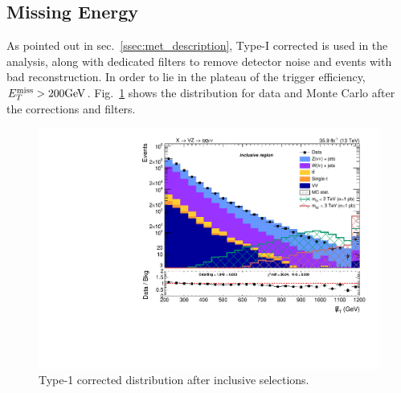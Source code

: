 
\subsection{Missing Energy}
As pointed out in sec.~\ref{ssec:met_description}, Type-I corrected \MET is used in the analysis, along with dedicated filters to remove detector noise and events with bad reconstruction. In order to lie in the plateau of the trigger efficiency, $E_T^{\text{miss}} > 200 \text{GeV}$. Fig.~\ref{fig:type1_met} shows the \MET distribution for data and Monte Carlo after the corrections and filters.
 
 \begin{figure}[!htb]
   \centering
     \includegraphics[width=.495\textwidth]{plots/v9_thesis/XVZnnInc/MEt_pt.pdf}
   
   \caption{Type-1 corrected \MET distribution after inclusive selections.}
   \label{fig:type1_met}
 \end{figure}


